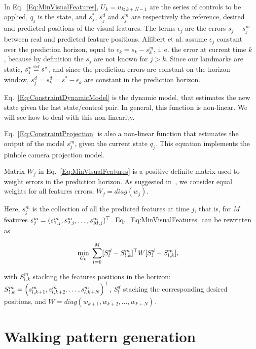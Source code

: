 In Eq.~\ref{Eq:MinVisualFeatures}, $U_{k}=u_{k:k+N-1}$ are the series of controls to be applied, $q_j$ is the state, and $s^*_j$, $s^d_j$ and $s^m_j$ are respectively the reference, desired and predicted positions of the visual features. The terms $\epsilon_j$ are the errors $s_j-s^m_j$ between real and predicted feature positions.
Allibert et al. assume $\epsilon_j$ constant over the prediction horizon, equal to $\epsilon_k=s_k-s^m_k$, i. e. the error at current time $k$, because by definition the $s_j$ are not known for $j>k$.
Since our landmarks are static, $s^*_j \stackrel{\mbox{\tiny def}}{=} s^*$, and since the prediction errors are constant on the horizon window, $s^d_j=s^d_k=s^*-\epsilon_k$ are constant in the prediction horizon.

Eq.~\ref{Eq:ConstraintDynamicModel} is the dynamic model, that estimates the new state given the last state/control pair. In general, this function is non-linear. We will see how to deal with this non-linearity.

Eq.~\ref{Eq:ConstraintProjection} is also a non-linear function that estimates the output of the model $s^m_j$, given the current state $q_j$. This equation implements the pinhole camera projection model.

Matrix $W_j$ in Eq.~\ref{Eq:MinVisualFeatures} is a positive definite matrix  used to weight errors in the prediction horizon. As suggested in~\cite{Allibert2010}, we   consider equal weights for all features errors, $W_j = diag(w_j)$. 

Here, $s^m_j$ is the collection of all the predicted features at time $j$, that is, for $M$ features $s^m_j = ( s_{1,j}^m, s_{2,j}^m, \hdots, s_{M,j}^m )^{\top} $. Eq.~\ref{Eq:MinVisualFeatures} can be rewritten as

\begin{equation}
\label{Eq:MinVisualFeatures2}
 \min_{U_{k}} \; \sum\limits_{l=0}^{M}  [S^d_{l} - S^m_{l,k}]^{\top} W [S^d_{l} - S^m_{l,k}],
\end{equation}

with $S^m_{l,k}$ stacking the features positions in the horizon: $S^m_{l,k} =  \left(
  s^m_{l,k+1},
  s^m_{l,k+2},
 \dots,
  s^m_{l,k+N}
 \right)^{\top}$, $S^d_{l}$ stacking the corresponding desired positions, and $W = diag(w_{k+1},w_{k+2},...,w_{k+N})$.

\section{Walking pattern generation}

